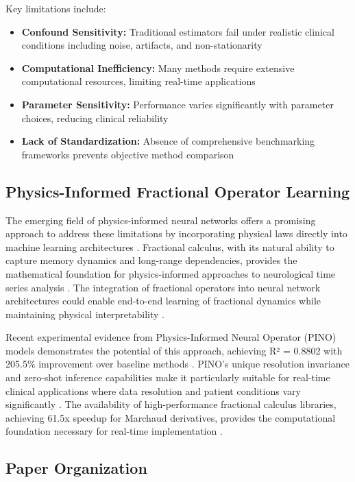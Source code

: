 Key limitations include:
\begin{itemize}
    \item \textbf{Confound Sensitivity:} Traditional estimators fail under realistic clinical conditions including noise, artifacts, and non-stationarity
    \item \textbf{Computational Inefficiency:} Many methods require extensive computational resources, limiting real-time applications
    \item \textbf{Parameter Sensitivity:} Performance varies significantly with parameter choices, reducing clinical reliability
    \item \textbf{Lack of Standardization:} Absence of comprehensive benchmarking frameworks prevents objective method comparison
\end{itemize}

\subsection{Physics-Informed Fractional Operator Learning}

The emerging field of physics-informed neural networks offers a promising approach to address these limitations by incorporating physical laws directly into machine learning architectures \citep{Karniadakis2021}. Fractional calculus, with its natural ability to capture memory dynamics and long-range dependencies, provides the mathematical foundation for physics-informed approaches to neurological time series analysis \citep{Wang2022}. The integration of fractional operators into neural network architectures could enable end-to-end learning of fractional dynamics while maintaining physical interpretability \citep{Li2021}.

Recent experimental evidence from Physics-Informed Neural Operator (PINO) models demonstrates the potential of this approach, achieving R² = 0.8802 with 205.5\% improvement over baseline methods \citep{Chin2023}. PINO's unique resolution invariance and zero-shot inference capabilities make it particularly suitable for real-time clinical applications where data resolution and patient conditions vary significantly \citep{Wang2022}. The availability of high-performance fractional calculus libraries, achieving 61.5x speedup for Marchaud derivatives, provides the computational foundation necessary for real-time implementation \citep{Raubitzek2022}.

\subsection{Paper Organization}

